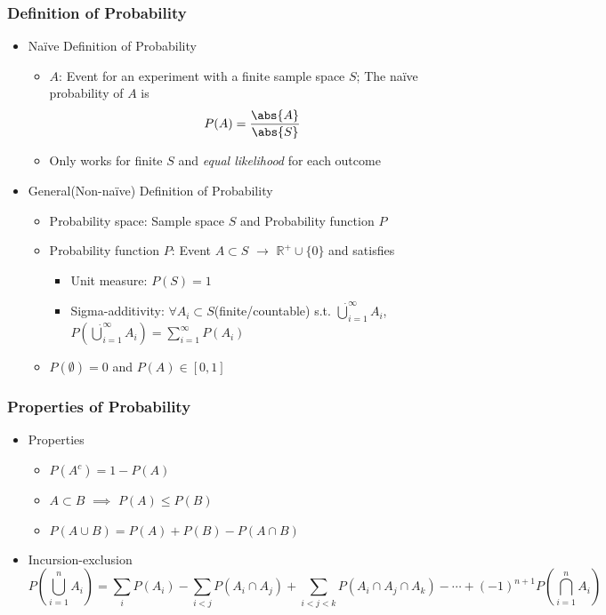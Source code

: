 \subsubsection*{Definition of Probability}
\begin{itemize}
    \item Na\"ive Definition of Probability
    \begin{itemize}
        \item $A$: Event for an experiment with a finite sample space $S$; The na\"ive probability of $A$ is
        \begin{equation}
            P(A)=\frac{\abs{A}}{\abs{S}}
        \end{equation}
        \item Only works for finite $S$ and \textit{equal likelihood} for each outcome
    \end{itemize}
    \item General(Non-na\"ive) Definition of Probability
    \begin{itemize}
        \item Probability space: Sample space $S$ and Probability function $P$
        \item Probability function $P$: Event $A\subset S$ $\to$ $\mathbb{R}^+\cup\{0\}$ and satisfies
        \begin{itemize}
            \item Unit measure: $P(S)=1$
            \item Sigma-additivity: $\forall A_i\subset S$(finite/countable) s.t. $\dot\bigcup_{i=1}^\infty A_i$, $P\left(\dot\bigcup_{i=1}^\infty A_i\right)=\sum_{i=1}^\infty P(A_i)$
        \end{itemize}
        \item $P(\emptyset)=0$ and $P(A)\in[0,1]$
    \end{itemize}
\end{itemize}

\subsubsection*{Properties of Probability}
\begin{itemize}
    \item Properties
    \begin{itemize}
        \item $P(A^c)=1-P(A)$
        \item $A\subset B$ $\implies$ $P(A)\leq P(B)$
        \item $P(A\cup B)=P(A)+P(B)-P(A\cap B)$
    \end{itemize}
    \item Incursion-exclusion
    \begin{equation}
        P\left(\bigcup_{i=1}^nA_i\right)=\sum_iP(A_i)-\sum_{i<j}P(A_i\cap A_j)+\sum_{i<j<k}P(A_i\cap A_j\cap A_k)-\cdots+(-1)^{n+1}P\left(\bigcap_{i=1}^nA_i\right)
    \end{equation}
\end{itemize}

